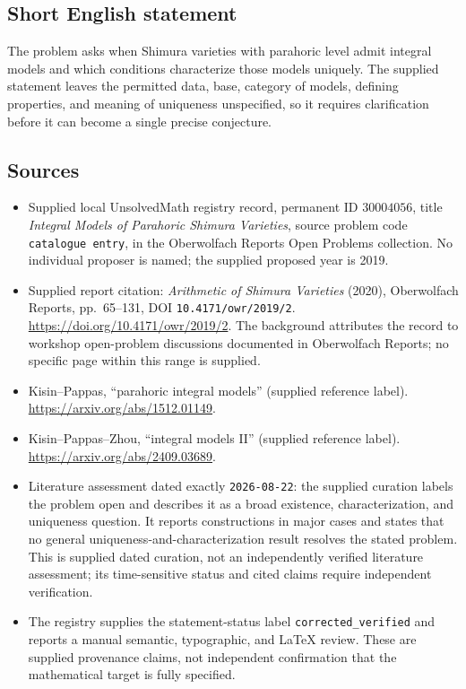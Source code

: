 \documentclass[11pt]{article}
\begin{document}
\subsection{Short English statement}
The problem asks when Shimura varieties with parahoric level admit integral models and which conditions characterize those models uniquely. The supplied statement leaves the permitted data, base, category of models, defining properties, and meaning of uniqueness unspecified, so it requires clarification before it can become a single precise conjecture.
\subsection{Sources}
\begin{itemize}
\item Supplied local UnsolvedMath registry record, permanent ID \(30004056\), title \emph{Integral Models of Parahoric Shimura Varieties}, source problem code \texttt{catalogue entry}, in the Oberwolfach Reports Open Problems collection. No individual proposer is named; the supplied proposed year is 2019.
\item Supplied report citation: \emph{Arithmetic of Shimura Varieties} (2020), Oberwolfach Reports, pp.~65--131, DOI \texttt{10.4171/owr/2019/2}. \url{https://doi.org/10.4171/owr/2019/2}. The background attributes the record to workshop open-problem discussions documented in Oberwolfach Reports; no specific page within this range is supplied.
\item Kisin--Pappas, ``parahoric integral models'' (supplied reference label). \url{https://arxiv.org/abs/1512.01149}.
\item Kisin--Pappas--Zhou, ``integral models II'' (supplied reference label). \url{https://arxiv.org/abs/2409.03689}.
\item Literature assessment dated exactly \texttt{2026-08-22}: the supplied curation labels the problem open and describes it as a broad existence, characterization, and uniqueness question. It reports constructions in major cases and states that no general uniqueness-and-characterization result resolves the stated problem. This is supplied dated curation, not an independently verified literature assessment; its time-sensitive status and cited claims require independent verification.
\item The registry supplies the statement-status label \texttt{corrected\_verified} and reports a manual semantic, typographic, and LaTeX review. These are supplied provenance claims, not independent confirmation that the mathematical target is fully specified.
\end{itemize}
\end{document}
